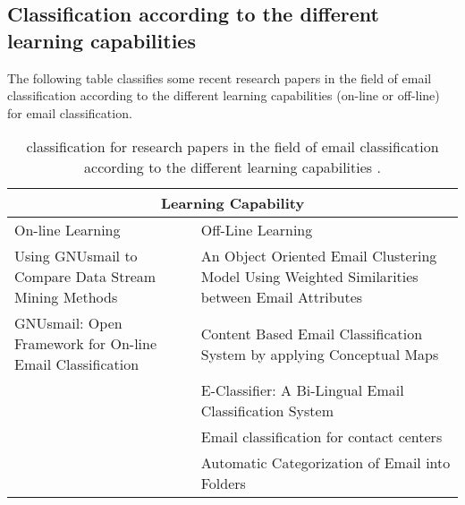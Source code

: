 \subsection{Classification according to the different learning capabilities}
The following table classifies some recent research papers in the field of email classification according to the different learning capabilities (on-line or off-line) for email classification.

\begin{center}
\begin{table}
\begin{tabular}{|p{6cm}|p{6cm}|}
\hline
\multicolumn{2}{|c|}{Learning Capability} \\
\hline
On-line Learning & Off-Line Learning 
\\ \hline
Using GNUsmail to Compare Data Stream Mining Methods \cite{JOSE11} &
An Object Oriented Email Clustering Model Using  Weighted Similarities 
between Email Attributes \cite{NARESH10}
\\ \hline

GNUsmail: Open Framework for On-line Email Classification \cite{MANUEL11}
& Content Based Email Classification System by applying Conceptual Maps \cite{BASKARAN09}
\\ \hline

& E-Classifier: A Bi-Lingual Email Classification System \cite{NOUF08}
\\ \hline

& Email classification for contact centers \cite{ANI03}
\\ \hline

& 
Automatic Categorization of Email into Folders \cite{RON04}

\\ \hline

\end{tabular}
\caption{classification for research papers in the field of email classification according to the different learning capabilities .}
\end{table}
\end{center}



